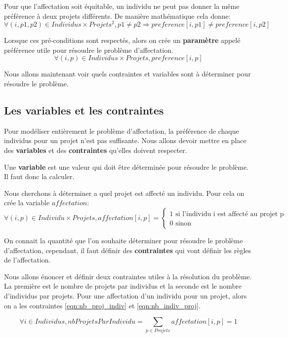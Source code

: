 \documentclass{polytech/polytech}
\begin{document}
Pour que l'affectation soit équitable, un individu ne peut pas donner la même préférence à deux projets différents. De manière mathématique cela donne:
$$
\forall (i,p1,p2) \in Individus \times Projets^2 , p1 \neq p2 \Rightarrow preference[i,p1] \neq preference[i,p2]
$$

Lorsque ces pré-conditions sont respectés, alors on crée un \textbf{paramètre} appelé préférence utile pour résoudre le problème d'affectation.
$$
\forall (i,p) \in Individus \times Projets, 
preference[i,p]
$$

Nous allons maintenant voir quels contraintes et variables sont à déterminer pour résoudre le problème.

\subsection{Les variables et les contraintes}

Pour modéliser entièrement le problème d'affectation, la préférence de chaque individus pour un projet n'est pas suffisante. 
Nous allons devoir mettre en place des \textbf{ variables} et des \textbf{contraintes} qu'elles doivent respecter.

Une \textbf{variable} est une valeur qui doit être déterminée pour résoudre le problème. Il faut donc la calculer.

Nous cherchons à déterminer a quel projet est affecté un individu. Pour cela on crée la variable $affectation$:
$$
\forall (i,p) \in Individu\times Projets , affectation[i,p]=
\left\lbrace
\begin{array}{l}
1 \text{ si l'individu i est affecté au projet p} \\
0 \text{ sinon}
\end{array} 
\right.
$$

On connait la quantité que l'on souhaite déterminer pour résoudre le problème d'affectation, cependant, il faut définir des \textbf{contraintes} qui vont définir les règles de l'affectation.

Nous allons énoncer et définir deux contraintes utiles à la résolution du problème. La première est le nombre de projets par individus et la seconde est le nombre d'individus par projets. 
Pour une affectation d'un individu pour un projet, alors on a les contraintes \eqref{eqn:nb_proj_indiv} et \eqref{eqn:nb_indiv_proj}.

\begin{equation}
\label{eqn:nb_proj_indiv}
\forall i \in Individus, nbProjetsParIndividu= \sum_{p \in Projets} affectation[i,p] = 1
\end{equation}
\end{document}
